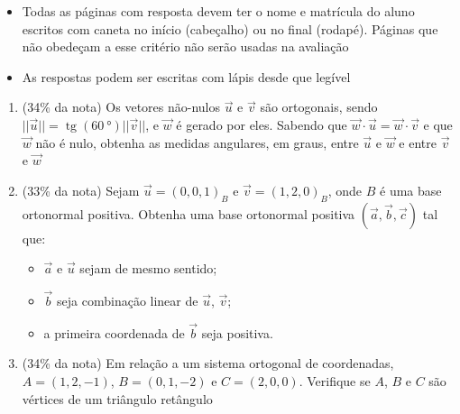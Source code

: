 \documentclass[12pt,a4paper,brazilian, fleqn]{article}
\DeclareMathOperator{\tg}{tg}
\newcommand{\ratio}[1]{(#1\% da nota)}
\renewcommand{\vec}[1]{\overrightarrow{#1}}
\begin{document}
\begin{tcolorbox}[colback=black!10, colframe=black!50, title=Observações]
    \begin{itemize}
        \item Todas as páginas com resposta devem ter o nome e matrícula do aluno
            escritos com caneta no início (cabeçalho) ou no final (rodapé). Páginas
            que não obedeçam a esse critério não serão usadas na avaliação
        \item As respostas podem ser escritas com lápis desde que legível
    \end{itemize}
\end{tcolorbox}

\begin{enumerate}
    \item \ratio{34} Os vetores não-nulos \(\vec{u}\) e \(\vec{v}\) são ortogonais, sendo \(||\vec{u}||=\tg{(\SI{60}{\degree})} ||\vec{v}||\), e
        \(\vec{w}\) é gerado por eles. Sabendo que \(\vec{w} \cdot \vec{u} = \vec{w} \cdot \vec{v} \) e que \(\vec{w}\)
        não é nulo, obtenha as medidas angulares, em graus, entre \(\vec{u}\) e \(\vec{w}\) e entre \(\vec{v}\) e
        \(\vec{w}\)

    \item \ratio{33} Sejam \(\vec{u}=(0,0,1)_B\) e \(\vec{v}=(1,2,0)_B\), onde \(B\) é uma base ortonormal positiva. Obtenha uma base
        ortonormal positiva \((\vec{a}, \vec{b}, \vec{c})\) tal que:

        \begin{itemize}
            \item \(\vec{a}\) e \(\vec{u}\) sejam de mesmo sentido;
            \item \(\vec{b}\) seja combinação linear de \(\vec{u}\), \(\vec{v}\);
            \item a primeira coordenada de \(\vec{b}\) seja positiva.
        \end{itemize}

    \item \ratio{34} Em relação a um sistema ortogonal de coordenadas, \(A=(1,2,-1)\), \(B=(0,1,-2)\) e \(C=(2,0,0)\).
        Verifique se \(A\), \(B\) e \(C\) são vértices de um triângulo retângulo
\end{enumerate}
\end{document}
